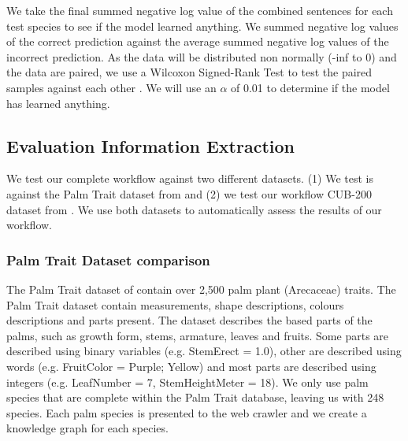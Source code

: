\documentclass[a4paper, 12pt, oneside]{book} %
\begin{document}
We take the final summed negative log  value of the combined sentences for each test species to see if the model learned anything.
We summed negative log values of the correct prediction against the average summed negative log values of the incorrect prediction.
As the data will be distributed non normally (-inf to 0) and the data are paired, we use a Wilcoxon Signed-Rank Test to test the paired samples against each other \autocite{wilcoxon_individual_1945}.
We will use an \(\alpha\) of 0.01 to determine if the model has learned anything. 


\subsection{Evaluation Information Extraction}
We test our complete workflow against two different datasets. 
(1) We test is against the Palm Trait dataset from \textcite{kissling_palmtraits_2019} and (2) we test our workflow CUB-200 dataset from \textcite{welinder_caltech-ucsd_2010}.
We use both datasets to automatically assess the results of our workflow.


\subsubsection{Palm Trait Dataset comparison} \label{par:palmtrait_methods}
The Palm Trait dataset of \textcite{kissling_palmtraits_2019} contain over 2,500 palm plant (Arecaceae) traits. 
The Palm Trait dataset contain measurements, shape descriptions, colours descriptions and parts present.
The dataset describes the based parts of the palms, such as growth form, stems, armature, leaves and fruits.
Some parts are described using binary variables (e.g. StemErect = 1.0), other are described using words (e.g. FruitColor = Purple; Yellow) and most parts are described using integers (e.g. LeafNumber = 7, StemHeightMeter = 18).
We only use palm species that are complete within the Palm Trait database, leaving us with 248 species.
Each palm species is presented to the web crawler and we create a knowledge graph for each species.
\newline
\end{document}
